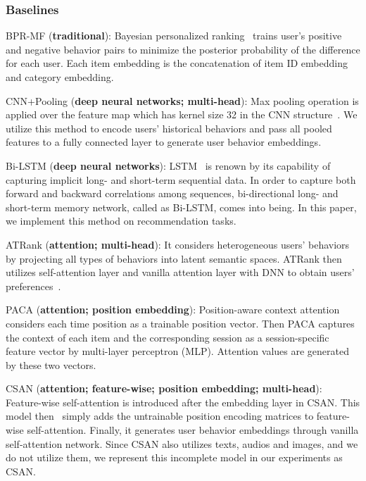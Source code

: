 \documentclass[preprint,12pt]{elsarticle}
\begin{document}
\begin{sloppypar}
\subsubsection{Baselines}

BPR-MF (\textbf{traditional}): Bayesian personalized ranking~\cite{rendle2009bpr} trains user's positive and negative behavior pairs to minimize the posterior probability of the difference for each user. Each item embedding is the concatenation of item ID embedding and category embedding.

CNN+Pooling (\textbf{deep neural networks; multi-head}): Max pooling operation is applied over the feature map which has kernel size 32 in the CNN structure~\cite{zheng2017joint}. We utilize this method to encode users' historical behaviors and pass all pooled features to a fully connected layer to generate user behavior embeddings.

Bi-LSTM (\textbf{deep neural networks}): LSTM~\cite{jozefowicz2015empirical} is renown by its capability of capturing implicit long- and short-term sequential data. In order to capture both forward and backward correlations among sequences, bi-directional long- and short-term memory network, called as Bi-LSTM, comes into being. In this paper, we implement this method on recommendation tasks.

ATRank (\textbf{attention; multi-head}): It considers heterogeneous users' behaviors by projecting all types of behaviors into latent semantic spaces. ATRank then utilizes self-attention layer and vanilla attention layer with DNN to obtain users' preferences~\cite{zhou2018atrank}.

PACA (\textbf{attention; position embedding}): Position-aware context attention~\cite{cao2020position} considers each time position as a trainable position vector. Then PACA captures the context of each item and the corresponding session as a session-specific feature vector by multi-layer perceptron (MLP). Attention values are generated by these two vectors.

CSAN (\textbf{attention; feature-wise; position embedding; multi-head}): Feature-wise self-attention is introduced after the embedding layer in CSAN. This model then~\cite{huang2018csan} simply adds the untrainable position encoding matrices to feature-wise self-attention. Finally, it generates user behavior embeddings through vanilla self-attention network. Since CSAN also utilizes texts, audios and images, and we do not utilize them, we represent this incomplete model in our experiments as CSAN.


\end{sloppypar}
\end{document}
